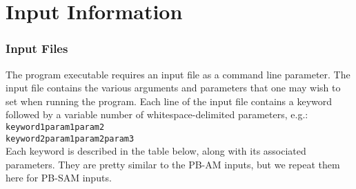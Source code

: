\section{Input Information}

\subsubsection{Input Files}

The program executable requires an input file as a command line parameter. The input file 
contains the various arguments and parameters that one may wish to set when running 
the program. Each line of the input file contains a keyword followed by a variable number 
of whitespace-delimited parameters, e.g.: \\

\texttt{keyword1\qquad param1\qquad param2} \\
\texttt{keyword2\qquad param1\qquad param2\qquad param3} \\

Each keyword is described in the table below, along with its associated parameters. 
They are pretty similar to the PB-AM inputs, but we repeat them here for PB-SAM inputs.

\setlength{\colthree}{10.1cm}
\setlength{\coltwo}{2.5cm}

